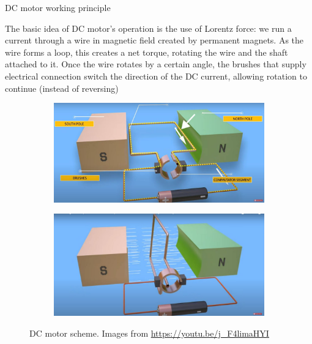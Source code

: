 \documentclass{beamer}
\begin{document}
\begin{frame}{DC motor working principle}
\begin{flushleft}

The basic idea of DC motor's operation is the use of Lorentz force: we run a current through a wire in magnetic field created by permanent magnets. As the wire forms a loop, this creates a net torque, rotating the wire and the shaft attached to it. Once the wire rotates by a certain angle, the brushes that supply electrical connection switch the direction of the DC current, allowing rotation to continue (instead of reversing)

\begin{figure}
	\centering
	\begin{subfigure}[b]{0.48\textwidth}
		\centering
		\includegraphics[width=\textwidth]{DCmotor1}
	\end{subfigure}
	\begin{subfigure}[b]{0.48\textwidth}
		\centering
		\includegraphics[width=\textwidth]{DCmotor2}
	\end{subfigure}
		\caption{DC motor scheme. Images from \url{https://youtu.be/j\_F4limaHYI}}
\end{figure}



\end{flushleft}
\end{frame}
\end{document}
